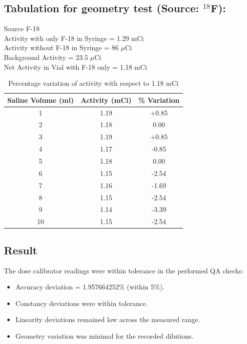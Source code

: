 \subsection{Tabulation for geometry test (Source: $^{18}$F):}

Source F-18 \\
Activity with only F-18 in Syringe = 1.29 mCi \\
Activity without F-18 in Syringe = 86 $\mu$Ci \\
Background Activity = 23.5 $\mu$Ci \\

Net Activity in Vial with F-18 only = 1.18 mCi

\begin{table}[H]
\centering
\begin{tabular}{|c|c|c|}
\hline
\textbf{Saline Volume (ml)} & \textbf{Activity (mCi)} & \textbf{\% Variation} \\
\hline
1  & 1.19 & +0.85 \\
2  & 1.18 & 0.00  \\
3  & 1.19 & +0.85 \\
4  & 1.17 & -0.85 \\
5  & 1.18 & 0.00  \\
6  & 1.15 & -2.54 \\
7  & 1.16 & -1.69 \\
8  & 1.15 & -2.54 \\
9  & 1.14 & -3.39 \\
10 & 1.15 & -2.54 \\
\hline
\end{tabular}
\caption{Percentage variation of activity with respect to 1.18 mCi}
\end{table}

\subsection{Result}
The dose calibrator readings were within tolerance in the performed QA checks:
\begin{itemize}
	\item Accuracy deviation = 1.957664252\% (within 5\%).
	\item Constancy deviations were within tolerance.
	\item Linearity deviations remained low across the measured range.
	\item Geometry variation was minimal for the recorded dilutions.
\end{itemize}

